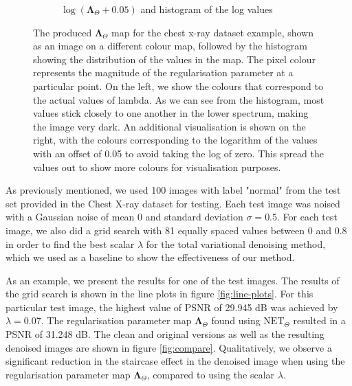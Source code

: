 \documentclass[12pt]{article}
\begin{document}
\begin{figure}[H]
\begin{subfigure}{0.48\textwidth}
  \caption{$\log{(\mathbf{\Lambda}_{\Theta} + 0.05)}$ and histogram of the log values}
  \end{subfigure}
  \caption{The produced $\mathbf{\Lambda}_{\Theta}$ map for the chest x-ray dataset example, shown as an image on a different colour map, followed by the histogram showing the distribution of the values in the map. The pixel colour represents the magnitude of the regularisation parameter at a particular point. On the left, we show the colours that correspond to the actual values of lambda. As we can see from the histogram, most values stick closely to one another in the lower spectrum, making the image very dark. An additional visualisation is shown on the right, with the colours corresponding to the logarithm of the values with an offset of 0.05 to avoid taking the log of zero. This spread the values out to show more colours for visualisation purposes.}
  \label{fig:lambda-map}
\end{figure}

As previously mentioned, we used 100 images with label "normal" from the test set provided in the Chest X-ray dataset for testing.
Each test image was noised with a Gaussian noise of mean 0 and standard deviation $\sigma = 0.5$.
For each test image, we also did a grid search with 81 equally spaced values between 0 and 0.8 in order to find the best scalar $\lambda$ for the total variational denoising method, which we used as a baseline to show the effectiveness of our method.

As an example, we present the results for one of the test images.
The results of the grid search is shown in the line plots in figure 
\ref{fig:line-plots}.
For this particular test image, the highest value of PSNR of 29.945 dB was achieved by $\lambda = 0.07$.
The regularisation parameter map $\mathbf{\Lambda}_\Theta$ found using $\text{NET}_{\Theta}$ resulted in a PSNR of 31.248 dB.
The clean and original versions as well as the resulting denoised images are shown in figure 
\ref{fig:compare}.
Qualitatively, we observe a significant reduction in the staircase effect in the denoised image when using the regularisation parameter map $\mathbf{\Lambda}_\Theta$, compared to using the scalar $\lambda$.
\end{document}

